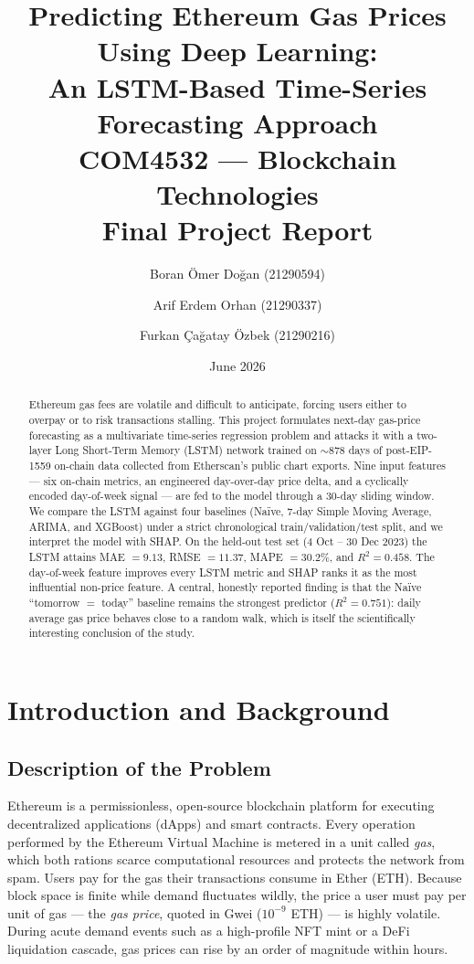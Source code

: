 \documentclass[11pt,a4paper]{article}
\title{\vspace{-1.0cm}\textbf{Predicting Ethereum Gas Prices Using Deep Learning:\\
An LSTM-Based Time-Series Forecasting Approach}\\[0.4em]
\large COM4532 --- Blockchain Technologies \\ Final Project Report}
\author{Boran \"Omer Do\u{g}an (21290594) \and Arif Erdem Orhan (21290337) \and Furkan \c{C}a\u{g}atay \"Ozbek (21290216)}
\date{June 2026}
\begin{document}
\maketitle
\thispagestyle{empty}

\begin{abstract}
\noindent
Ethereum gas fees are volatile and difficult to anticipate, forcing users either to overpay
or to risk transactions stalling. This project formulates next-day gas-price forecasting as a
multivariate time-series regression problem and attacks it with a two-layer Long Short-Term
Memory (LSTM) network trained on $\sim$878 days of post-EIP-1559 on-chain data collected from
Etherscan's public chart exports. Nine input features --- six on-chain metrics, an engineered
day-over-day price delta, and a cyclically encoded day-of-week signal --- are fed to the model
through a 30-day sliding window. We compare the LSTM against four baselines (Na\"ive, 7-day
Simple Moving Average, ARIMA, and XGBoost) under a strict chronological train/validation/test
split, and we interpret the model with SHAP. On the held-out test set (4 Oct -- 30 Dec 2023) the
LSTM attains MAE $=9.13$, RMSE $=11.37$, MAPE $=30.2\%$, and $R^2=0.458$. The day-of-week
feature improves every LSTM metric and SHAP ranks it as the most influential non-price feature.
A central, honestly reported finding is that the Na\"ive ``tomorrow $=$ today'' baseline remains
the strongest predictor ($R^2=0.751$): daily average gas price behaves close to a random walk,
which is itself the scientifically interesting conclusion of the study.
\end{abstract}

\tableofcontents
\newpage

\section{Introduction and Background}

\subsection{Description of the Problem}
Ethereum is a permissionless, open-source blockchain platform for executing decentralized
applications (dApps) and smart contracts. Every operation performed by the Ethereum Virtual
Machine is metered in a unit called \emph{gas}, which both rations scarce computational
resources and protects the network from spam. Users pay for the gas their transactions consume
in Ether (ETH). Because block space is finite while demand fluctuates wildly, the price a user
must pay per unit of gas --- the \emph{gas price}, quoted in Gwei ($10^{-9}$ ETH) --- is highly
volatile. During acute demand events such as a high-profile NFT mint or a DeFi liquidation
cascade, gas prices can rise by an order of magnitude within hours.
\end{document}
